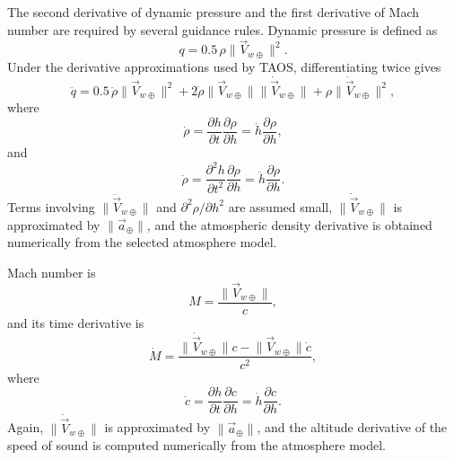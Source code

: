 The second derivative of dynamic pressure and the first derivative of Mach number
are required by several guidance rules. Dynamic pressure is defined as
\begin{equation}
  q=0.5\,\rho\lVert\vec V_{w\oplus}\rVert^2.
  \label{eq:dynamic-pressure-rate-definition}
\end{equation}
Under the derivative approximations used by TAOS, differentiating twice gives
\begin{equation}
  \ddot q
  =0.5\,\ddot\rho\lVert\vec V_{w\oplus}\rVert^2
   +2\dot\rho\lVert\vec V_{w\oplus}\rVert
      \lVert\dot{\vec V}_{w\oplus}\rVert
   +\rho\lVert\dot{\vec V}_{w\oplus}\rVert^2,
  \label{eq:dynamic-pressure-second-derivative}
\end{equation}
where
\begin{equation}
  \dot\rho
  =\frac{\partial h}{\partial t}\frac{\partial\rho}{\partial h}
  =\dot h\frac{\partial\rho}{\partial h},
  \label{eq:atmospheric-density-rate}
\end{equation}
and
\begin{equation}
  \ddot\rho
  =\frac{\partial^2 h}{\partial t^2}\frac{\partial\rho}{\partial h}
  =\ddot h\frac{\partial\rho}{\partial h}.
  \label{eq:atmospheric-density-second-rate}
\end{equation}
Terms involving $\lVert\ddot{\vec V}_{w\oplus}\rVert$ and
$\partial^2\rho/\partial h^2$ are assumed small,
$\lVert\dot{\vec V}_{w\oplus}\rVert$ is approximated by
$\lVert\vec a_{\oplus}\rVert$, and the atmospheric density derivative is obtained
numerically from the selected atmosphere model.

Mach number is
\begin{equation}
  M=\frac{\lVert\vec V_{w\oplus}\rVert}{c},
  \label{eq:mach-number-rate-definition}
\end{equation}
and its time derivative is
\begin{equation}
  \dot M
  =\frac{
    \lVert\dot{\vec V}_{w\oplus}\rVert c
    -\lVert\vec V_{w\oplus}\rVert\dot c
  }{c^2},
  \label{eq:mach-number-rate}
\end{equation}
where
\begin{equation}
  \dot c
  =\frac{\partial h}{\partial t}\frac{\partial c}{\partial h}
  =\dot h\frac{\partial c}{\partial h}.
  \label{eq:speed-of-sound-rate}
\end{equation}
Again, $\lVert\dot{\vec V}_{w\oplus}\rVert$ is approximated by
$\lVert\vec a_{\oplus}\rVert$, and the altitude derivative of the speed of sound is
computed numerically from the atmosphere model.
